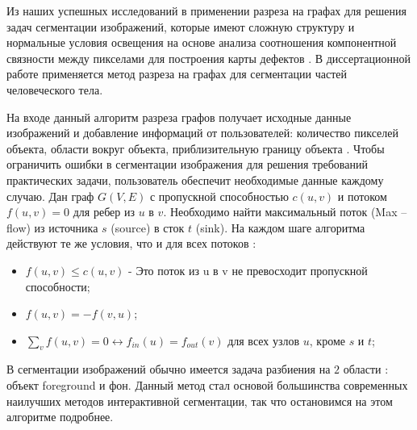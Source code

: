 Из наших успешных исследований в применении разреза на графах для решения задач сегментации изображений, которые имеют сложную структуру и нормальные условия освещения на основе анализа соотношения компонентной связности между пикселами для построения карты дефектов \cite{TLong1,Tlong2}. В диссертационной работе применяется метод разреза на графах для сегментации частей человеческого тела.

На входе данный алгоритм разреза графов получает исходные данные изображений и добавление информаций от пользователей: количество пикселей объекта, области вокруг объекта, приблизительную границу объекта \cite{Boykov2001}. Чтобы ограничить ошибки в сегментации изображения для решения требований практических задачи, пользователь обеспечит необходимые данные каждому случаю. Дан граф $G\left(V,E\right)$ с пропускной способностью $c\left(u,v\right)$ и потоком $f\left(u,v\right)=0$ для ребер из $u$ в $v$. Необходимо найти максимальный поток (Max – flow) из источника $s$  (source) в сток $t$ (sink). На каждом шаге алгоритма действуют те же условия, что и для всех потоков \cite{Cormen2001}:

\begin{itemize}
	\item $f\left(u,v\right) \leq c\left(u,v\right)$ - Это поток из u в v не превосходит пропускной способности;
	\item $f\left(u,v\right) =-f\left(v,u\right)$;
	\item $\sum_vf\left(u,v\right)=0 \leftrightarrow f_{in}\left(u\right) =f_{out}\left(v\right)$ для всех узлов $u$, кроме $s$ и $t$;
\end{itemize}
В сегментации изображений обычно имеется задача разбиения на $2$ области : объект foreground и фон. Данный метод стал основой большинства современных наилучших методов интерактивной сегментации, так что остановимся на этом алгоритме подробнее.

